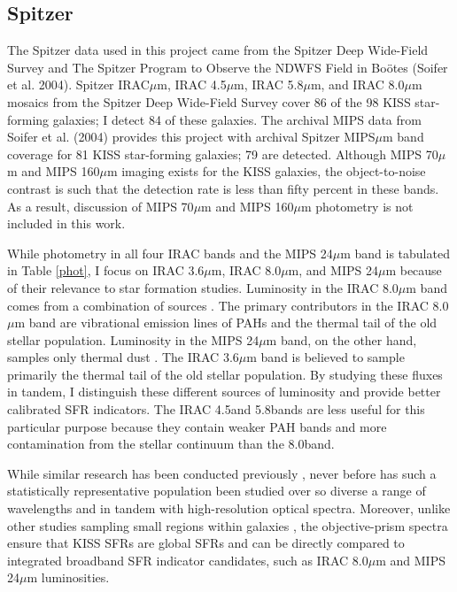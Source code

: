 \subsection{Spitzer}

The Spitzer data used in this project came from the Spitzer Deep Wide-Field Survey \citep{SDWFS} and The Spitzer Program to Observe the NDWFS Field in Bo\"{o}tes (Soifer et al. 2004).  Spitzer IRAC$\mu$m, IRAC 4.5$\mu$m, IRAC 5.8$\mu$m, and IRAC 8.0$\mu$m mosaics from the Spitzer Deep Wide-Field Survey cover 86 of the 98 KISS star-forming galaxies; I detect 84 of these galaxies. The archival MIPS data from Soifer et al. (2004) provides this project with archival Spitzer MIPS$\mu$m band coverage for 81 KISS star-forming galaxies; 79 are detected. Although MIPS 70$\mu$m and MIPS 160$\mu$m imaging exists for the KISS galaxies, the object-to-noise contrast is such that the detection rate is less than fifty percent in these bands.  As a result, discussion of MIPS 70$\mu$m and MIPS 160$\mu$m photometry is not included in this work.


While photometry in all four IRAC bands and the MIPS 24$\mu$m band is tabulated in Table \ref{phot}, I focus on IRAC 3.6$\mu$m, IRAC 8.0$\mu$m, and MIPS 24$\mu$m because of their relevance to star formation studies. Luminosity in the IRAC 8.0$\mu$m band comes from a combination of sources \citep{Wu}. The primary contributors in the IRAC 8.0$\mu$m band are vibrational emission lines of PAHs and the thermal tail of the old stellar population. Luminosity in the MIPS 24$\mu$m band, on the other hand, samples only thermal dust \citep{Wu}. The IRAC 3.6$\mu$m band is believed to sample primarily the thermal tail of the old stellar population. By studying these fluxes in tandem, I distinguish these different sources of luminosity and provide better calibrated SFR indicators. The IRAC 4.5\micron and 5.8\micron bands are less useful for this particular purpose because they contain weaker PAH bands and more contamination from the stellar continuum than the 8.0\micron band.

While similar research has been conducted previously \citep{Rosenberg,Calzetti2007,Calzetti2010,Wu,AlonsoHerrero,PerezGonzalez}, never before has such a statistically representative population been studied over so diverse a range of wavelengths and in tandem with high-resolution optical spectra. Moreover, unlike other studies sampling small regions within galaxies \citep{Calzetti2005,PerezGonzalez}, the objective-prism spectra ensure that KISS SFRs are global SFRs and can be directly compared to integrated broadband SFR indicator candidates, such as IRAC 8.0$\mu$m and MIPS 24$\mu$m luminosities.

